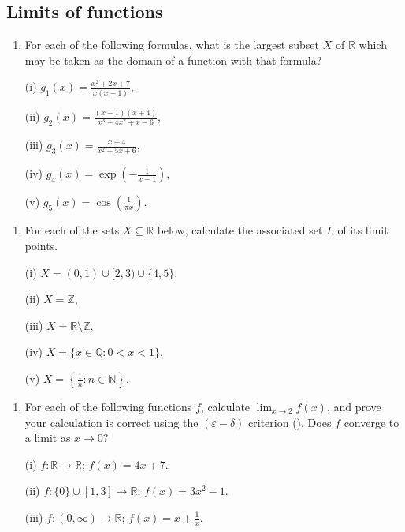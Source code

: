\documentclass[letterpaper,10pt,english]{jupyterBook}
\begin{document}
\subsection{Limits of functions}
\label{\detokenize{Problems:limits-of-functions}}\label{\detokenize{Problems:id1}}\begin{enumerate}
%
\item {} 
\sphinxAtStartPar
For each of the following formulas, what is the largest subset \(X\) of \(\mathbb{R}\)  which may be taken as the domain of a function with that formula?

\sphinxAtStartPar
(i) \(g_{1}(x) = \displaystyle\frac{x^{2} + 2x + 7}{x(x+1)}\),

\sphinxAtStartPar
(ii) \(g_{2}(x) = \displaystyle\frac{(x-1)(x+4)}{x^{3} + 4x^{2} + x - 6}\),

\sphinxAtStartPar
(iii) \(g_{3}(x) = \displaystyle\frac{x+4}{x^{2}+5x + 6}\),

\sphinxAtStartPar
(iv) \(g_{4}(x) = \exp{\left(-\displaystyle\frac{1}{x-1}\right)}\),

\sphinxAtStartPar
(v) \(g_{5}(x) = \cos\left(\displaystyle\frac{1}{\pi x}\right)\).

\end{enumerate}
\label{\detokenize{Problems:id2}}\begin{enumerate}
%
\setcounter{enumi}{1}
\item {} 
\sphinxAtStartPar
For each of the sets \(X\subseteq\mathbb{R}\) below, calculate the associated set \(L\) of its limit points.

\sphinxAtStartPar
(i) \(X=(0,1)\cup[2,3)\cup\{4,5\}\),

\sphinxAtStartPar
(ii) \(X=\mathbb{Z}\),

\sphinxAtStartPar
(iii) \(X=\mathbb{R}\setminus\mathbb{Z}\),

\sphinxAtStartPar
(iv) \(X=\{x\in\mathbb{Q}:0<x<1\}\),

\sphinxAtStartPar
(v) \(X=\displaystyle\left\{\frac{1}{n}:n\in\mathbb{N}\right\}\).

\end{enumerate}
\label{\detokenize{Problems:id3}}\begin{enumerate}
%
\setcounter{enumi}{2}
\item {} 
\sphinxAtStartPar
For each of the following functions \(f\), calculate \(\lim_{x\rightarrow 2}f(x)\), and prove your calculation is correct using the \((\varepsilon-\delta)\) criterion (). Does \(f\) converge to a limit as \(x\rightarrow 0\)?

\sphinxAtStartPar
(i) \(f:\mathbb{R}\to\mathbb{R}\); \(f(x)=4x+7\).

\sphinxAtStartPar
(ii) \(f:\{0\}\cup[1,3]\to\mathbb{R}\); \(f(x)=3x^2-1\).

\sphinxAtStartPar
(iii) \(f:(0,\infty)\to\mathbb{R}\); \(f(x)=x+\frac{1}{x}\).

\end{enumerate}
\end{document}
